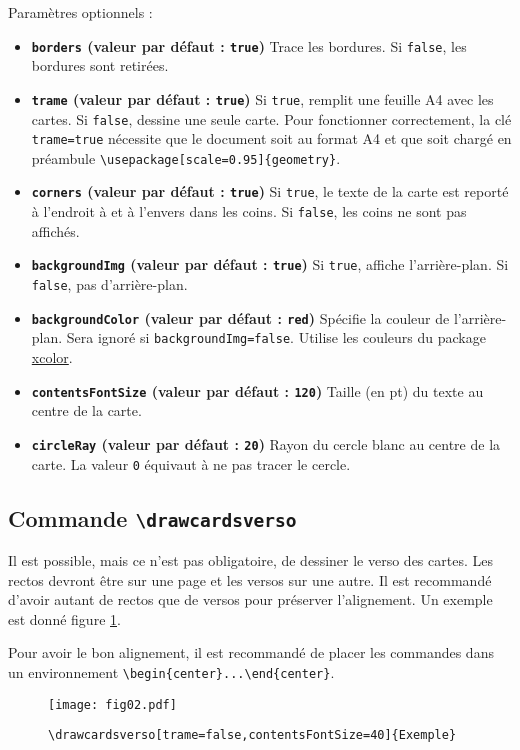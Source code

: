 \documentclass[a4paper, 12pt]{article}
\newcommand{\key}[3]{\textbf{\texttt{#1} (valeur par défaut : \texttt{#2})} #3}
\newcommand{\commande}[1]{\texttt{\textbackslash#1}}
\begin{document}
Paramètres optionnels :
\begin{itemize}
	\item \key{borders}{true}{Trace les bordures. Si \texttt{false}, les bordures sont retirées.}
	\item \key{trame}{true}{Si \texttt{true}, remplit une feuille A4 avec les cartes. Si \texttt{false}, dessine une seule carte. Pour fonctionner correctement, la clé \texttt{trame=true} nécessite que le document soit au format A4 et que soit chargé en préambule \commande{usepackage[scale=0.95]\{geometry\}}}.
	\item \key{corners}{true}{Si \texttt{true}, le texte de la carte est reporté à l'endroit à et à l'envers dans les coins. Si \texttt{false}, les coins ne sont pas affichés.}
	\item \key{backgroundImg}{true}{Si \texttt{true}, affiche l'arrière-plan. Si \texttt{false}, pas d'arrière-plan.}
	\item \key{backgroundColor}{red}{Spécifie la couleur de l'arrière-plan. Sera ignoré si \texttt{backgroundImg=false}. Utilise les couleurs du package \href{https://www.ctan.org/pkg/xcolor}{xcolor}.}
	\item \key{contentsFontSize}{120}{Taille (en pt) du texte au centre de la carte.}
	\item \key{circleRay}{20}{Rayon du cercle blanc au centre de la carte. La valeur \texttt 0 équivaut à ne pas tracer le cercle.}
\end{itemize}

	\subsection{Commande \commande{drawcardsverso}}
Il est possible, mais ce n'est pas obligatoire, de dessiner le verso des cartes. Les rectos devront être sur une page et les versos sur une autre. Il est recommandé d'avoir autant de rectos que de versos pour préserver l'alignement. Un exemple est donné figure \ref{fig:verso}.

Pour avoir le bon alignement, il est recommandé de placer les commandes dans un environnement \verb!\begin{center}...\end{center}!.
\begin{figure}[h]\begin{center}
	\caption{\commande{drawcardsverso[trame=false,contentsFontSize=40]\{Exemple\}}}
	\texttt{[image: fig02.pdf]}\label{fig:verso}
\end{center}\end{figure}
\end{document}
